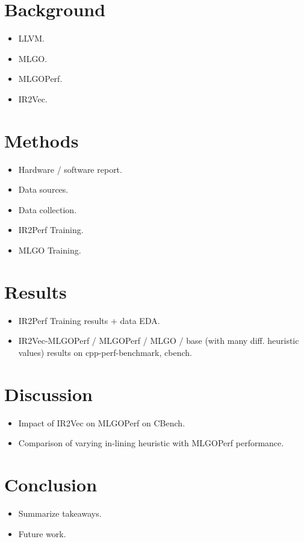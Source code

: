 \documentclass[nohyperref]{article}
\theoremstyle{plain}
\theoremstyle{definition}
\theoremstyle{remark}
\begin{document}
\section{Background}
\label{background}
\begin{itemize}
\item LLVM\@.
\item MLGO\@.
\item MLGOPerf\@.
\item IR2Vec\@.
\end{itemize}

\section{Methods}
\label{methods}
\begin{itemize}
\item Hardware / software report\@.
\item Data sources\@.
\item Data collection\@.
\item IR2Perf Training\@.
\item MLGO Training\@.
\end{itemize}

\section{Results}
\label{results}
\begin{itemize}
\item IR2Perf Training results + data EDA\@.
\item IR2Vec-MLGOPerf / MLGOPerf / MLGO / base (with many diff. heuristic values) results on cpp-perf-benchmark, cbench\@.
\end{itemize}

\section{Discussion}
\label{discussion}
\begin{itemize}
\item Impact of IR2Vec on MLGOPerf on CBench\@.
\item Comparison of varying in-lining heuristic with MLGOPerf performance\@.
\end{itemize}

\section{Conclusion}
\label{conclusion}
\begin{itemize}
\item Summarize takeaways\@.
\item Future work\@.
\end{itemize}
\end{document}
